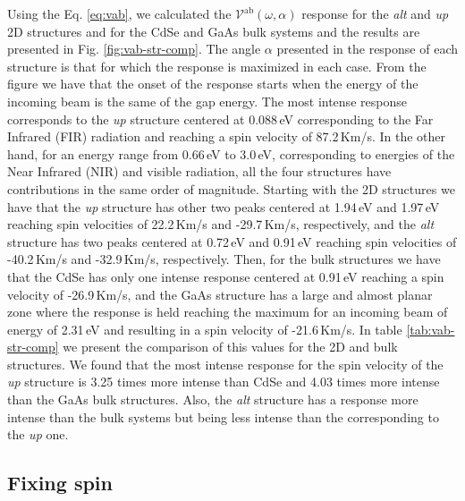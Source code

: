 \documentclass[prb,11pt,tightenlines,twocolumn,aps]{revtex4-1}
\begin{document}
Using the Eq. \eqref{eq:vab}, we calculated the
$\mathcal{V}^{\mathrm{ab}}(\omega,\alpha)$ response for the \emph{alt} and
\emph{up} 2D structures and for the CdSe and GaAs bulk systems and the results
are presented in Fig. \ref{fig:vab-str-comp}. The angle $\alpha$ presented in
the response of each structure is that for which the response is maximized in
each case.
% 
From the figure we have that the onset of the response starts when the energy of
the incoming beam is the same of the gap energy.
% 
The most intense response corresponds to the \emph{up} structure centered at
0.088\,eV corresponding to the Far Infrared (FIR) radiation and reaching a spin
velocity of 87.2\,Km/s.
% 
In the other hand, for an energy range from 0.66\,eV to 3.0\,eV, corresponding
to energies of the Near Infrared (NIR) and visible radiation, all the four
structures have contributions in the same order of magnitude.
% 
Starting with the 2D structures we have that the \emph{up} structure has other
two peaks centered at 1.94\,eV and 1.97\,eV reaching spin velocities of
22.2\,Km/s and -29.7\,Km/s, respectively, and the \emph{alt} structure has two
peaks centered at 0.72\,eV and 0.91\,eV reaching spin velocities of -40.2\,Km/s
and -32.9\,Km/s, respectively.
% 
Then, for the bulk structures we have that the CdSe has only one intense
response centered at 0.91\,eV reaching a spin velocity of -26.9\,Km/s, and the
GaAs structure has a large and almost planar zone where the response is held
reaching the maximum for an incoming beam of energy of 2.31\,eV and resulting in
a spin velocity of -21.6\,Km/s.
% 
In table \ref{tab:vab-str-comp} we present the comparison of this values for the
2D and bulk structures. We found that the most intense response for the spin
velocity of the \emph{up} structure is 3.25 times more intense than CdSe and
4.03 times more intense than the GaAs bulk structures. Also, the \emph{alt}
structure has a response more intense than the bulk systems but being less
intense than the corresponding to the \emph{up} one.
% 




\subsection{Fixing spin} %
\label{sec:res-fixspin}
\end{document}
